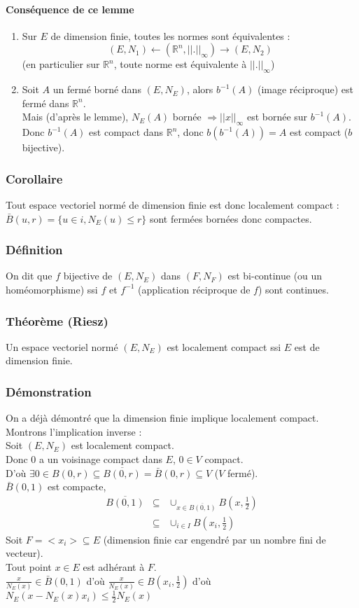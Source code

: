 \documentclass[a4paper, oneside]{report}
\newcommand{\R}{\mathbb{R}}
\newcommand{\evn}{espace vectoriel normé }
\newcommand{\defi}{\subsubsection{Définition}}
\newcommand{\dem}{\subsubsection{Démonstration}}
\newcommand{\cor}{\subsubsection{Corollaire}}
\newcommand{\fracun}[1]{\frac{1}{#1}}
\begin{document}
\paragraph{Conséquence de ce lemme}
\begin{enumerate}
\item Sur $E$ de dimension finie, toutes les normes sont équivalentes :
$$(E,N_1) \leftarrow (\R^n, ||.||_\infty) \rightarrow (E,N_2)$$
(en particulier sur $\R^n$, toute norme est équivalente à $||.||_\infty$)

\item Soit $A$ un fermé borné dans $(E,N_E)$, alors $b^{-1}(A)$ (image réciproque) est fermé dans $\R^n$.\\
Mais (d'après le lemme), $N_E(A)$ bornée $\Rightarrow ||x||_\infty$  est bornée sur $b^{-1}(A)$.\\
Donc $b^{-1}(A)$ est compact dans $\R^n$, donc $b(b^{-1}(A))=A$ est compact ($b$ bijective).
\end{enumerate}


\cor
Tout \evn de dimension finie est donc localement compact : $\bar{B}(u,r) = \{u\in i, N_E(u) \leq r \}$ sont fermées bornées donc compactes.

\defi
On dit que $f$ bijective de $(E,N_E)$ dans $(F,N_F)$ est bi-continue (ou un homéomorphisme) ssi $f$ et $f^{-1}$ (application réciproque de $f$) sont continues.

\subsubsection{Théorème (Riesz)}
Un \evn $(E,N_E)$ est localement compact ssi $E$ est de dimension finie.

\dem
On a déjà démontré que la dimension finie implique localement compact.\\
Montrons l'implication inverse :\\
Soit $(E,N_E)$ est localement compact.\\
Donc $0$ a un voisinage compact dans $E$, $0\in V$ compact.\\
D'où $\exists 0\in B(0,r)\subseteq \overline{B(0,r)} = \bar{B}(0,r) \subseteq V$ ($V$ fermé).\\
$\bar{B}(0,1)$ est compacte, 
$$\begin{array}{lll}
\overline{B(0,1)} &\subseteq & \cup_{x\in \overline{B(0,1)}} B(x,\fracun{2})\\
&\subseteq & \cup_{i\in I}B(x_i, \fracun{2})
\end{array}$$
Soit $F = <x_i> \subseteq E$ (dimension finie car engendré par un nombre fini de vecteur).\\
Tout point $x\in E$ est adhérant à $F$.\\
$\frac{x}{N_E(x)} \in \bar{B}(0,1)$ d'où $\frac{x}{N_E(x)} \in B(x_i, \fracun{2})$ d'où $N_E(x-N_E(x)x_i)\leq \fracun{2}N_E(x)$
\end{document}
